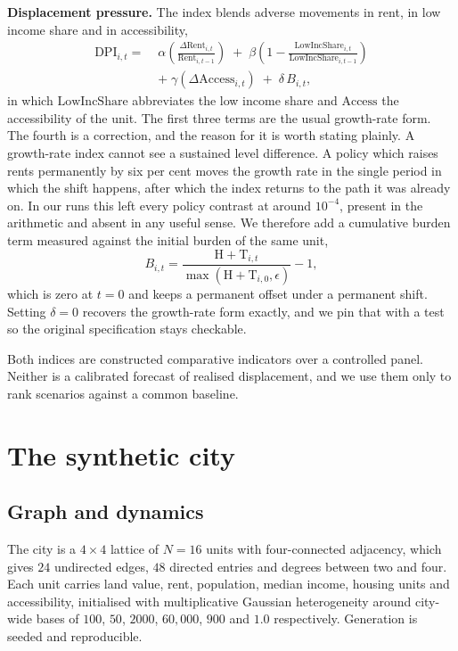 \documentclass[journal]{IEEEtran}
\newcommand{\HT}{\mathrm{H}\!+\!\mathrm{T}}
\newcommand{\DPI}{\mathrm{DPI}}
\begin{document}
\textbf{Displacement pressure.} The index blends adverse movements in rent, in
low income share and in accessibility,
\begin{align}
  \DPI_{i,t} =\;& \alpha \left( \frac{\Delta \mathrm{Rent}_{i,t}}
                                    {\mathrm{Rent}_{i,t-1}} \right)
  \;+\; \beta \left( 1 - \frac{\mathrm{LowIncShare}_{i,t}}
                          {\mathrm{LowIncShare}_{i,t-1}} \right) \nonumber\\
  &+\; \gamma \left( \Delta \mathrm{Access}_{i,t} \right)
   \;+\; \delta \, B_{i,t} ,
  \label{eq:dpi}
\end{align}
in which $\mathrm{LowIncShare}$ abbreviates the low income share and
$\mathrm{Access}$ the accessibility of the unit.
The first three terms are the usual growth-rate form. The fourth is a
correction, and the reason for it is worth stating plainly. A growth-rate index
cannot see a sustained level difference. A policy which raises rents permanently
by six per cent moves the growth rate in the single period in which the shift
happens, after which the index returns to the path it was already on. In our
runs this left every policy contrast at around $10^{-4}$, present in the
arithmetic and absent in any useful sense. We therefore add a cumulative burden
term measured against the initial burden of the same unit,
\begin{equation}
  B_{i,t} = \frac{\HT_{i,t}}{\max(\HT_{i,0}, \epsilon)} - 1 ,
  \label{eq:burden}
\end{equation}
which is zero at $t = 0$ and keeps a permanent offset under a permanent shift.
Setting $\delta = 0$ recovers the growth-rate form exactly, and we pin that with
a test so the original specification stays checkable.

Both indices are constructed comparative indicators over a controlled panel.
Neither is a calibrated forecast of realised displacement, and we use them only
to rank scenarios against a common baseline.

\section{The synthetic city}
\label{sec:generator}

\subsection{Graph and dynamics}

The city is a $4 \times 4$ lattice of $N = 16$ units with four-connected
adjacency, which gives $24$ undirected edges, $48$ directed entries and degrees
between two and four. Each unit carries land value, rent, population, median
income, housing units and accessibility, initialised with multiplicative
Gaussian heterogeneity around city-wide bases of $100$, $50$, $2000$, $60{,}000$,
$900$ and $1.0$ respectively. Generation is seeded and reproducible.
\end{document}
